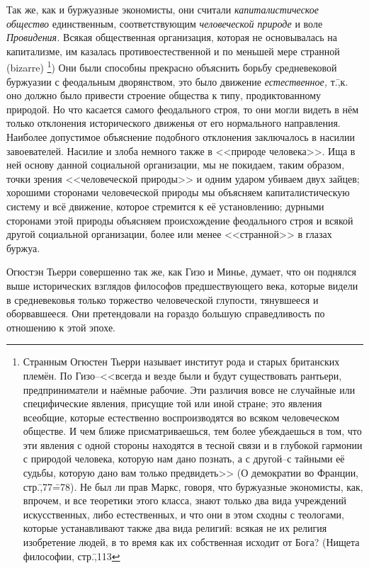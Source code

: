 Так же, как и буржуазные экономисты, они считали \emph{капиталистическое общество} единственным, соответствующим \emph{человеческой природе} и воле \emph{Провидения.} Всякая общественная организация, которая не основывалась на капитализме, им казалась противоестественной и по меньшей мере странной (bizarre) \footnote{Странным Огюстен Тьерри называет институт рода и старых британских племён. По Гизо\---<<всегда и везде были и будут существовать рантьери, предприниматели и наёмные рабочие. Эти различия вовсе не случайные или специфические явления, присущие той или иной стране; это явления всеобщие, которые естественно воспроизводятся во всяком человеческом обществе. И чем ближе присматриваешься, тем более убеждаешься в том, что эти явления с одной стороны находятся в тесной связи и в глубокой гармонии с природой человека, которую нам дано познать, а с другой\---с тайными её судьбы, которую дано вам только предвидеть>> (О демократии во Франции, стр.\=,77\==78). Не был ли прав Маркс, говоря, что буржуазные экономисты, как, впрочем, и все теоретики этого класса, знают только два вида учреждений искусственных, либо естественных, и что они в этом сходны с теологами, которые устанавливают также два вида религий: всякая не их религия изобретение людей, в то время как их собственная исходит от Бога? (Нищета философии, стр.\=,113}) Они были способны прекрасно объяснить борьбу средневековой буржуазии с феодальным дворянством, это было движение \emph{естественное,} т.\=,к. оно должно было привести строение общества к типу, продиктованному природой. Но что касается самого феодального строя, то они могли видеть в нём только отклонения исторического движенья от его нормального направления. Наиболее допустимое объяснение подобного отклонения заключалось в насилии завоевателей. Насилие и злоба немного также в <<природе человека>>. Ища в ней основу данной социальной организации, мы не покидаем, таким образом, точки зрения <<человеческой природы>> и одним ударом убиваем двух зайцев; хорошими сторонами человеческой природы мы объясняем капиталистическую систему и всё движение, которое стремится к её установлению; дурными сторонами этой природы объясняем происхождение феодального строя и всякой другой социальной организации, более или менее <<странной>> в глазах буржуа.

Огюстэн Тьерри совершенно так же, как Гизо и Минье, думает, что он поднялся выше исторических взглядов философов предшествующего века, которые видели в средневековья только торжество человеческой глупости, тянувшееся и оборвавшееся. Они претендовали на гораздо большую справедливость по отношению к этой эпохе.

